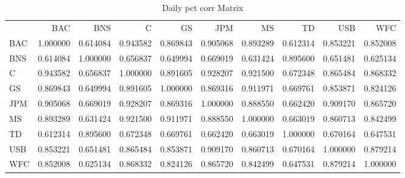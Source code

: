\documentclass{article}
\begin{document}
\begin{table}
\caption{Daily pct corr Matrix}
\label{tab:daily_pct_corr}
\begin{tabular}{lrrrrrrrrr}
 & BAC & BNS & C & GS & JPM & MS & TD & USB & WFC \\
BAC & 1.000000 & 0.614084 & 0.943582 & 0.869843 & 0.905068 & 0.893289 & 0.612314 & 0.853221 & 0.852008 \\
BNS & 0.614084 & 1.000000 & 0.656837 & 0.649994 & 0.669019 & 0.631424 & 0.895600 & 0.651481 & 0.625134 \\
C & 0.943582 & 0.656837 & 1.000000 & 0.891605 & 0.928207 & 0.921500 & 0.672348 & 0.865484 & 0.868332 \\
GS & 0.869843 & 0.649994 & 0.891605 & 1.000000 & 0.869316 & 0.911971 & 0.669761 & 0.853871 & 0.824126 \\
JPM & 0.905068 & 0.669019 & 0.928207 & 0.869316 & 1.000000 & 0.888550 & 0.662420 & 0.909170 & 0.865720 \\
MS & 0.893289 & 0.631424 & 0.921500 & 0.911971 & 0.888550 & 1.000000 & 0.663019 & 0.860713 & 0.842499 \\
TD & 0.612314 & 0.895600 & 0.672348 & 0.669761 & 0.662420 & 0.663019 & 1.000000 & 0.670164 & 0.647531 \\
USB & 0.853221 & 0.651481 & 0.865484 & 0.853871 & 0.909170 & 0.860713 & 0.670164 & 1.000000 & 0.879214 \\
WFC & 0.852008 & 0.625134 & 0.868332 & 0.824126 & 0.865720 & 0.842499 & 0.647531 & 0.879214 & 1.000000 \\
\end{tabular}
\end{table}
\end{document}
